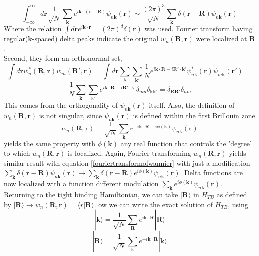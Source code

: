 \documentclass{article}
\begin{document}
\begin{equation}
	\int_{-\infty}^{\infty}d\mathbf{r}\frac{1}{\sqrt{N}}\sum_{\mathbf{k}}e^{i\mathbf{k}\cdot(\mathbf{r-R})}\psi_{n\mathbf{k}}(\mathbf{r})\sim\frac{(2\pi)^3}{\sqrt{N}}\sum_\mathbf{k}\delta(\mathbf{r-R})\psi_{n\mathbf{k}}(\mathbf{r}) \label{fouriertransformofwannier}
\end{equation}
Where the relation $\int d\mathbf{r}e^{i\mathbf{k\cdot r}}=(2\pi)^d\delta(\mathbf{r})$ was used. Fourier transform having regular($\mathbf{k}$-spaced) delta peaks indicate the original $w_n(\mathbf{R,r})$ were localized at $\mathbf{R}$.\\
Second, they form an orthonormal set,
$$\int d\mathbf{r}w_{n}^{*}(\mathbf{R,r})w_m(\mathbf{R', r})=\int d\mathbf{r}\sum_{\mathbf{k}}\sum_{\mathbf{k'}}\frac{1}{N}e^{i\mathbf{k\cdot\mathbf{R}}-i\mathbf{R'\cdot k'}}\psi_{n\mathbf{k}}^*(\mathbf{r})\psi_{m\mathbf{k}}(\mathbf{r'})=$$
$$\frac{1}{N}\sum_{\mathbf{k}}\sum_{\mathbf{k'}}e^{i\mathbf{k\cdot\mathbf{R}}-i\mathbf{R'\cdot k'}}\delta_{mn}\delta_{\mathbf{k}\mathbf{k'}}=\delta_{\mathbf{R}\mathbf{R'}}\delta_{nm}$$
This comes from the orthogonality of $\psi_{n\mathbf{k}}(\mathbf{r})$ itself. Also, the definition of $w_n(\mathbf{R,r})$ is not singular, since $\psi_{n\mathbf{k}}(\mathbf{r})$ is defined within the first Brillouin zone
$$w_{n}(\mathbf{R,r})=\frac{1}{\sqrt{N}}\sum_{\mathbf{k}}e^{-i\mathbf{k}\cdot\mathbf{R}+i\phi(\mathbf{k})}\psi_{n\mathbf{k}}(\mathbf{r})$$
yields the same property with $\phi(\mathbf{k})$ any real function that controls the 'degree' to which $w_n(\mathbf{R,r})$ is localized.  Again, Fourier transforming $w_n(\mathbf{R,r})$ yields similar result with equation \eqref{fouriertransformofwannier} with just a modification $\sum_{\mathbf{k}}\delta(\mathbf{r-R})\psi_{n\mathbf{k}}(\mathbf{r})\to \sum_{\mathbf{k}}\delta(\mathbf{r-R})e^{i\phi(\mathbf{k})}\psi_{n\mathbf{k}}(\mathbf{r})$. Delta functions are now localized with a function different modulation $\sum_{\mathbf{k}}e^{i\phi(\mathbf{k})}\psi_{n\mathbf{k}}(\mathbf{r})$.\\
Returning to the tight binding Hamiltonian, we can take $|\mathbf{R}\rangle$ in $H_{TB}$ as defined by $|\mathbf{R}\rangle\to w_{n}(\mathbf{R,r})=\langle r|\mathbf{R}\rangle$. ow we can write the exact solution of $H_{TB}$, using
$$|\mathbf{k}\rangle=\frac{1}{\sqrt{N}}\sum_{\mathbf{R}}e^{i\mathbf{k}\cdot\mathbf{R}}|\mathbf{R}\rangle$$
\begin{equation}
	|\mathbf{R}\rangle=\frac{1}{\sqrt{N}}\sum_{\mathbf{k}}e^{-i\mathbf{k}\cdot\mathbf{R}}|\mathbf{k}\rangle \label{rtok}
\end{equation}
\end{document}
